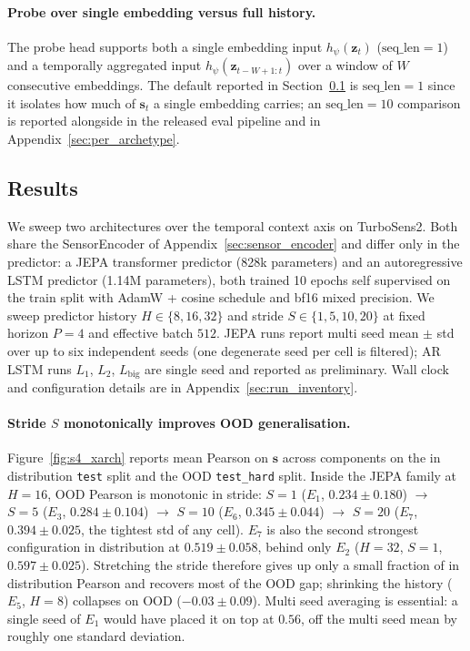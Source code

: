 \documentclass{article}
\begin{document}
\paragraph{Probe over single embedding versus full history.}
The probe head supports both a single embedding input
$h_\psi(\mathbf{z}_t)$ ($\mathrm{seq\_len}{=}1$) and a temporally
aggregated input $h_\psi(\mathbf{z}_{t-W+1:t})$ over a window of
$W$ consecutive embeddings. The default reported in
Section~\ref{sec:results} is $\mathrm{seq\_len}{=}1$ since it isolates
how much of $\mathbf{s}_t$ a single embedding carries; an
$\mathrm{seq\_len}{=}10$ comparison is reported alongside in the
released eval pipeline and in Appendix~\ref{sec:per_archetype}.




\subsection{Results}
\label{sec:results}

We sweep two architectures over the temporal context axis on
TurboSens2. Both share the SensorEncoder of
Appendix~\ref{sec:sensor_encoder} and differ only in the predictor: a
JEPA transformer predictor (828k parameters) and an autoregressive
LSTM predictor (1.14M parameters), both trained 10 epochs self
supervised on the train split with AdamW + cosine schedule and bf16
mixed precision. We sweep predictor history $H \in \{8, 16, 32\}$ and
stride $S \in \{1, 5, 10, 20\}$ at fixed horizon $P{=}4$ and effective
batch $512$. JEPA runs report multi seed mean $\pm$ std over up to
six independent seeds (one degenerate seed per cell is filtered);
AR LSTM runs $L_1$, $L_2$, $L_\mathrm{big}$ are single seed and
reported as preliminary. Wall clock and configuration details are in
Appendix~\ref{sec:run_inventory}.

\paragraph{Stride $S$ monotonically improves OOD generalisation.}
Figure~\ref{fig:s4_xarch} reports mean Pearson on $\mathbf{s}$ across components on the in
distribution \texttt{test} split and the OOD \texttt{test\_hard}
split. Inside the JEPA family at $H{=}16$, OOD Pearson is monotonic
in stride: $S{=}1$ ($E_1$, $0.234 \pm 0.180$) $\to$ $S{=}5$ ($E_3$,
$0.284 \pm 0.104$) $\to$ $S{=}10$ ($E_6$, $0.345 \pm 0.044$) $\to$
$S{=}20$ ($E_7$, $\mathbf{0.394 \pm 0.025}$, the tightest std of any
cell). $E_7$ is also the second strongest configuration in
distribution at $0.519 \pm 0.058$, behind only $E_2$ ($H{=}32$,
$S{=}1$, $\mathbf{0.597 \pm 0.025}$). Stretching the stride therefore
gives up only a small fraction of in distribution Pearson and recovers
most of the OOD gap; shrinking the history ($E_5$, $H{=}8$) collapses
on OOD ($-0.03 \pm 0.09$). Multi seed averaging is essential: a single
seed of $E_1$ would have placed it on top at $0.56$, off the multi
seed mean by roughly one standard deviation.
\end{document}
